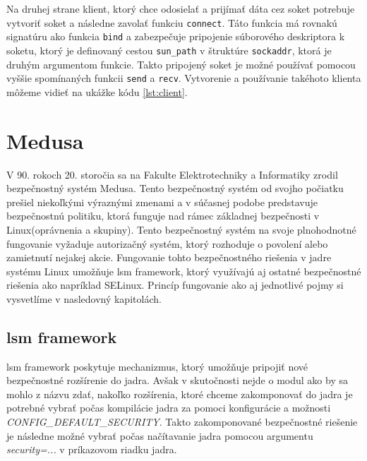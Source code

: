 Na druhej strane klient, ktorý chce odosielať a prijímať dáta cez soket potrebuje vytvoriť soket a následne zavolať funkciu \texttt{connect}. Táto funkcia má rovnakú signatúru ako funkcia \texttt{bind} a zabezpečuje pripojenie súborového deskriptora k soketu, ktorý je definovaný cestou \texttt{sun\_path} v štruktúre \texttt{sockaddr}, ktorá je druhým argumentom funkcie. Takto pripojený soket je možné používať pomocou vyššie spomínaných funkcii \texttt{send} a \texttt{recv}. Vytvorenie a používanie takéhoto klienta môžeme vidieť na ukážke kódu \ref{lst:client}.\cite{beej}

\section{Medusa}
V 90. rokoch 20. storočia sa na Fakulte Elektrotechniky a Informatiky zrodil bezpečnostný systém Medusa. Tento bezpečnostný systém od svojho počiatku prešiel niekoľkými výraznými zmenami a v súčasnej podobe predstavuje bezpečnostnú politiku, ktorá funguje nad rámec základnej bezpečnosti v Linux(oprávnenia a skupiny). Tento bezpečnostný systém na svoje plnohodnotné fungovanie vyžaduje autorizačný systém, ktorý rozhoduje o povolení alebo zamietnutí nejakej akcie. Fungovanie tohto bezpečnostného riešenia v jadre systému Linux umožňuje \acrshort{lsm} framework, ktorý využívajú aj ostatné bezpečnostné riešenia ako napríklad \acrshort{SELinux}. Princíp fungovanie ako aj jednotlivé pojmy si vysvetlíme v nasledovný kapitolách.

\subsection{\acrshort{lsm} framework}
\acrfull{lsm} framework poskytuje mechanizmus, ktorý umožňuje pripojiť nové bezpečnostné rozšírenie do jadra. Avšak v skutočnosti nejde o modul ako by sa mohlo z názvu zdať, nakoľko rozšírenia, ktoré chceme zakomponovať do jadra je potrebné vybrať počas kompilácie jadra za pomoci konfigurácie a možnosti \textit{CONFIG\_DEFAULT\_SECURITY}. Takto zakomponované bezpečnostné riešenie je následne možné vybrať počas načítavanie jadra pomocou argumentu \textit{security=...} v príkazovom riadku jadra.\cite{lsm}

